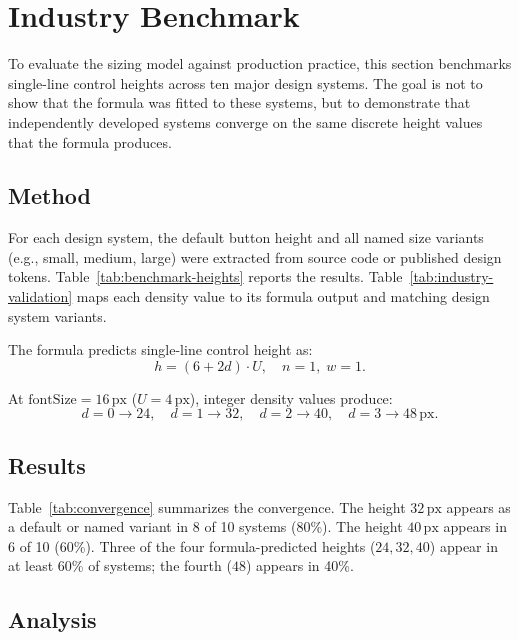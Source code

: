 \section{Industry Benchmark}
\label{sec:validation}

To evaluate the sizing model against production practice, this section benchmarks single-line control heights across ten major design systems. The goal is not to show that the formula was fitted to these systems, but to demonstrate that independently developed systems converge on the same discrete height values that the formula produces.

\subsection{Method}

For each design system, the default button height and all named size variants (e.g., small, medium, large) were extracted from source code or published design tokens. Table~\ref{tab:benchmark-heights} reports the results. Table~\ref{tab:industry-validation} maps each density value to its formula output and matching design system variants.

The formula predicts single-line control height as:
\begin{equation}
h = (6 + 2d) \cdot U, \quad n = 1,\; w = 1.
\end{equation}

At $\text{fontSize} = 16\,\text{px}$ ($U = 4\,\text{px}$), integer density values produce:
\[
d = 0 \to 24,\quad
d = 1 \to 32,\quad
d = 2 \to 40,\quad
d = 3 \to 48\,\text{px}.
\]

\subsection{Results}







Table~\ref{tab:convergence} summarizes the convergence. The height $32\,\text{px}$ appears as a default or named variant in 8 of 10 systems (80\%). The height $40\,\text{px}$ appears in 6 of 10 (60\%). Three of the four formula-predicted heights ($24, 32, 40$) appear in at least 60\% of systems; the fourth ($48$) appears in 40\%.

\subsection{Analysis}

